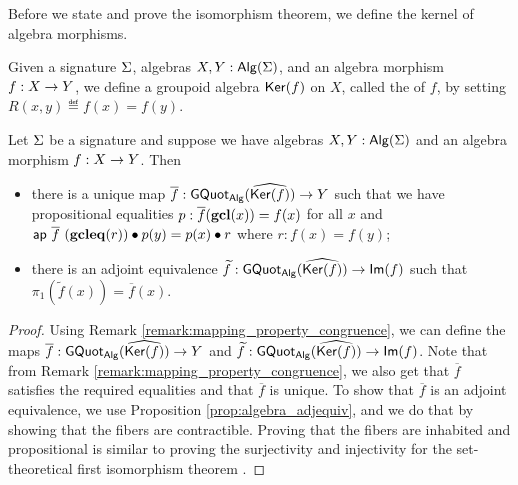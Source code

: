 Before we state and prove the isomorphism theorem, we define the kernel of algebra morphisms.

\begin{definition}[Kernel]
Given a signature $\Sigma$, algebras $X, Y : \mathsf{Alg}(\Sigma)$, and an algebra morphism $f : X \rightarrow Y$, we define a groupoid algebra $\mathsf{Ker}(f)$ on $X$, called the  of $f$, by setting $R(x, y) \eqdef f(x) = f(y)$.
\end{definition}

\begin{theorem}\label{thm:iso_thm}
Let $\Sigma$ be a signature and suppose we have algebras $X, Y : \mathsf{Alg}(\Sigma)$ and an algebra morphism $f : X \rightarrow Y$.
Then
\begin{itemize}
	\item there is a unique map $\overline{f} : \mathsf{GQuot}_{\mathsf{Alg}}(\widehat{\mathsf{Ker}(f)}) \rightarrow Y$ such that we have propositional equalities $p : \overline{f}(\operatorname{\mathbf{gcl}}(x)) = f(x)$ for all $x$ and $\mathsf{ap} \ \overline{f} \ (\operatorname{\mathbf{gcleq}}(r)) \bullet p(y) = p(x) \bullet r$ where $r : f(x) = f(y)$;
	\item there is an adjoint equivalence $\widetilde{f} : \mathsf{GQuot}_{\mathsf{Alg}}(\widehat{\mathsf{Ker}(f)}) \rightarrow \mathsf{Im}(f)$ such that $\pi_1(\widetilde{f}(x)) = \overline{f}(x)$.
\end{itemize}
\end{theorem}

\begin{proof}
Using Remark \ref{remark:mapping_property_congruence}, we can define the maps $\overline{f} : \mathsf{GQuot}_{\mathsf{Alg}}(\widehat{\mathsf{Ker}(f)}) \rightarrow Y$ and $\widetilde{f} : \mathsf{GQuot}_{\mathsf{Alg}}(\widehat{\mathsf{Ker}(f)}) \rightarrow \mathsf{Im}(f)$.
Note that from Remark \ref{remark:mapping_property_congruence}, we also get that $\overline{f}$ satisfies the required equalities and that $\overline{f}$ is unique.
To show that $\overline{f}$ is an adjoint equivalence, we use Proposition \ref{prop:algebra_adjequiv}, and we do that by showing that the fibers are contractible.
Proving that the fibers are inhabited and propositional is similar to proving the surjectivity and injectivity for the set-theoretical first isomorphism theorem \cite{lynge2019}.
\end{proof}